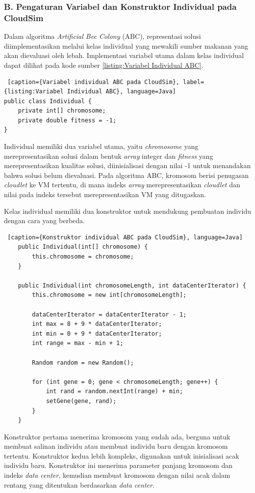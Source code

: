 \subsubsection{B. Pengaturan Variabel dan Konstruktor Individual pada CloudSim}
Dalam algoritma \textit{Artificial Bee Colony} (ABC), representasi solusi diimplementasikan melalui kelas individual yang mewakili sumber makanan yang akan dievaluasi oleh lebah. Implementasi variabel utama dalam kelas individual dapat dilihat pada kode sumber \ref{listing:Variabel Individual ABC}.

\begin{lstlisting} [caption={Variabel individual ABC pada CloudSim}, label={listing:Variabel Individual ABC}, language=Java]
public class Individual {
    private int[] chromosome;
    private double fitness = -1;
}
\end{lstlisting}

Individual memiliki dua variabel utama, yaitu \textit{chromosome} yang merepresentasikan solusi dalam bentuk \textit{array} integer dan \textit{fitness} yang merepresentasikan kualitas solusi, diinisialisasi dengan nilai -1 untuk menandakan bahwa solusi belum dievaluasi. Pada algoritma ABC, kromosom berisi penugasan \textit{cloudlet} ke VM tertentu, di mana indeks \textit{array} merepresentasikan \textit{cloudlet} dan nilai pada indeks tersebut merepresentasikan VM yang ditugaskan.

Kelas individual memiliki dua konstruktor untuk mendukung pembuatan individu dengan cara yang berbeda.

\begin{lstlisting} [caption={Konstruktor individual ABC pada CloudSim}, language=Java]
    public Individual(int[] chromosome) {
        this.chromosome = chromosome;
    }

    public Individual(int chromosomeLength, int dataCenterIterator) {
        this.chromosome = new int[chromosomeLength];

        dataCenterIterator = dataCenterIterator - 1;
        int max = 8 + 9 * dataCenterIterator;
        int min = 0 + 9 * dataCenterIterator;
        int range = max - min + 1;

        Random random = new Random();

        for (int gene = 0; gene < chromosomeLength; gene++) {
            int rand = random.nextInt(range) + min;
            setGene(gene, rand);
        }
    }
\end{lstlisting}

Konstruktor pertama menerima kromosom yang sudah ada, berguna untuk membuat salinan individu atau membuat individu baru dengan kromosom tertentu. Konstruktor kedua lebih kompleks, digunakan untuk inisialisasi acak individu baru. Konstruktor ini menerima parameter panjang kromosom dan indeks \textit{data center}, kemudian membuat kromosom dengan nilai acak dalam rentang yang ditentukan berdasarkan \textit{data center}.

